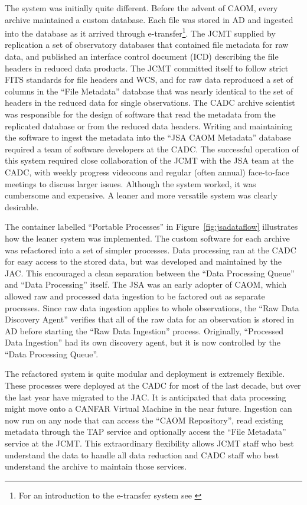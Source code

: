 \documentclass[final,authoryear,5p,times,twocolumn]{elsarticle}
\begin{document}
The system was initially quite different.  Before the advent of CAOM, every archive maintained a custom database.  Each file was stored in AD and ingested into the database as it arrived through e-transfer\footnote{For an introduction to the e-transfer system see \citet{2005ASPC..347..647M}}.  The JCMT supplied by replication a set of observatory databases that contained file metadata for raw data, and published an interface control document (ICD) describing the file headers in reduced data products. The JCMT committed itself to follow strict FITS standards for file headers and WCS, and for raw data reproduced a set of columns in the ``File Metadata'' database that was nearly identical  to the set of headers in the reduced data for single observations.   The CADC archive scientist was responsible for the design of software that read the metadata from the replicated database or from the reduced data headers.  Writing and maintaining the software to ingest the metadata into the ``JSA CAOM Metadata'' database required a team of software developers at the CADC.  The successful operation of this system required close collaboration of the JCMT with the JSA team at the CADC, with weekly progress videocons and regular (often annual) face-to-face meetings to discuss larger issues.  Although the system worked, it was cumbersome and expensive.  A leaner and more versatile system was clearly desirable.

The container labelled ``Portable Processes'' in Figure~\ref{fig:jsadataflow} illustrates how the leaner system was implemented.  The custom software for each archive was refactored into a set of simpler processes.  Data processing ran at the CADC for easy access to the stored data, but was developed and maintained by the JAC.  This encouraged a clean separation between the ``Data Processing Queue'' and  ``Data Processing'' itself.    The JSA was an early adopter of CAOM, which allowed raw and processed data ingestion to be factored out as separate processes.  Since raw data ingestion applies to whole observations, the ``Raw Data Discovery Agent'' verifies that all of the raw data for an observation is stored in AD before starting the ``Raw Data Ingestion'' process.  Originally, ``Processed Data Ingestion'' had its own discovery agent, but it is now controlled by the ``Data Processing Queue''.

The refactored system is quite modular and deployment is extremely flexible. These processes were deployed at the CADC for most of the last decade, but over the last year have migrated to the JAC.  It is anticipated that data processing might move onto a CANFAR Virtual Machine in the near future.  Ingestion can now run on any node that can access the ``CAOM Repository'', read existing metadata through the TAP service and optionally access the ``File Metadata'' service at the JCMT.   This extraordinary flexibility allows JCMT staff who best understand the data to handle all data reduction and CADC staff who best understand the archive to maintain those services.
\end{document}
